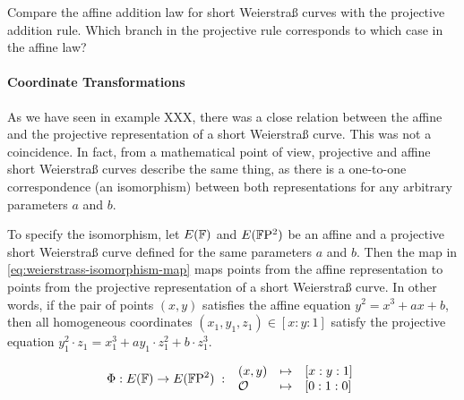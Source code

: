 



\begin{exercise}
Compare the affine addition law for short Weierstraß curves with the projective addition rule. Which branch in the projective rule corresponds to which case in the affine law? 
\end{exercise}

\paragraph{Coordinate Transformations} As we have seen in example XXX, there was a close relation between the affine and the projective representation of a short Weierstraß curve. This was not a coincidence.
In fact, from a mathematical point of view, projective and affine short Weierstraß curves describe the same thing, as there is a one-to-one correspondence (an isomorphism) between both representations for any arbitrary parameters $a$ and $b$. 

To specify the isomorphism, let $E(\mathbb{F})$ and $E(\mathbb{F}\mathrm{P}^2)$ be an affine and a projective short Weierstraß curve defined for the same parameters $a$ and $b$. Then the map in \ref{eq:weierstrass-isomorphism-map} maps points from the affine representation to points from the projective representation of a short Weierstraß curve. In other words, if the pair of points $(x,y)$ satisfies the affine equation $y^2= x^3 + ax + b$, then all homogeneous coordinates $(x_1,y_1,z_1)\in [x:y:1]$ satisfy the projective equation $y_1^2\cdot z_1= x_1^3 + ay_1\cdot z_1^2 + b\cdot z_1^3$. 

\begin{equation}\label{eq:weierstrass-isomorphism-map}
\Phi : E(\mathbb{F}) \to E(\mathbb{F}\mathrm{P}^2)\;:\;
\begin{array}{lcl}
(x,y)       &\mapsto & [x:y:1]\\
\mathcal{O} &\mapsto & [0:1:0]
\end{array}
\end{equation}


